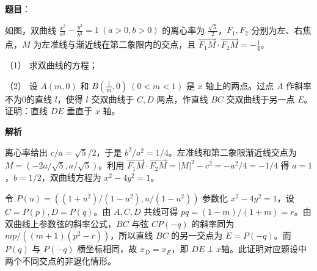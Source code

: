 \begin{answer}

\textbf{题目}：

如图，双曲线 $\frac{x^2}{a^2}-\frac{y^2}{b^2}=1\ (a>0,b>0)$ 的离心率为 $\frac{\sqrt5}2$，$F_1,F_2$ 分别为左、右焦点，$M$ 为左准线与渐近线在第二象限内的交点，且 $\overrightarrow{F_1M}\cdot\overrightarrow{F_2M}=-\frac14$。

（1） 求双曲线的方程；

（2） 设 $A(m,0)$ 和 $B(\frac1m,0)\ (0<m<1)$ 是 $x$ 轴上的两点。过点 $A$ 作斜率不为0的直线 $l$，使得 $l$ 交双曲线于 $C,D$ 两点，作直线 $BC$ 交双曲线于另一点 $E$。证明：直线 $DE$ 垂直于 $x$ 轴。
\nopagebreak[4]
\begin{center}\end{center}
\nopagebreak[4]
\textbf{解析}


离心率给出 $c/a=\sqrt5/2$，于是 $b^2/a^2=1/4$。左准线和第二象限渐近线交点为 $M=(-2a/\sqrt5,a/\sqrt5)$。利用 $\overrightarrow{F_1M}\cdot\overrightarrow{F_2M}=|M|^2-c^2=-a^2/4=-1/4$ 得 $a=1$，$b=1/2$，双曲线方程为 $x^2-4y^2=1$。


令 $P(u)=((1+u^2)/(1-u^2),u/(1-u^2))$ 参数化 $x^2-4y^2=1$，设 $C=P(p),D=P(q)$。由 $A,C,D$ 共线可得 $pq=(1-m)/(1+m)=r$。由双曲线上参数弦的斜率公式，$BC$ 与弦 $CP(-q)$ 的斜率同为 $mp/((m+1)(p^2-r))$，所以直线 $BC$ 的另一交点为 $E=P(-q)$。而 $P(q)$ 与 $P(-q)$ 横坐标相同，故 $x_D=x_E$，即 $DE\perp x$轴。此证明对应题设中两个不同交点的非退化情形。



\end{answer}